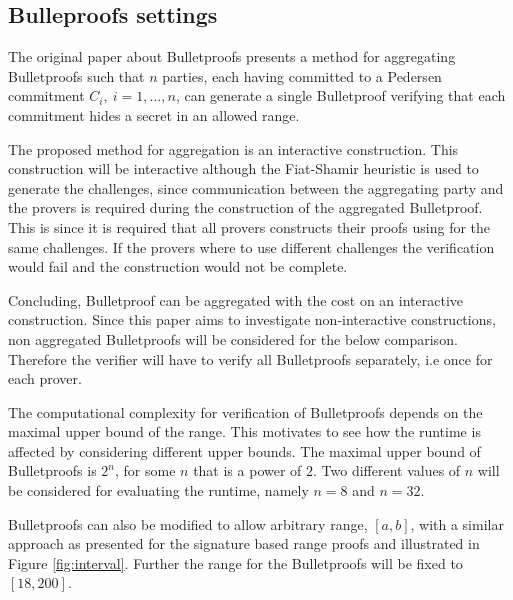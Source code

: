 \subsection*{Bulleproofs settings}

The original paper about Bulletproofs \cite{bulletProofs_theory} presents a method for aggregating Bulletproofs such that $n$ parties, each having committed to a Pedersen commitment $C_i,\: i=1,...,n$, can generate a single Bulletproof verifying that each commitment hides a secret in an allowed range. 

The proposed method for aggregation is an interactive construction. This construction will be interactive   although the Fiat-Shamir heuristic is used to generate the challenges, since communication between the aggregating party and the provers is required during the construction of the aggregated Bulletproof. This is since it is required that all provers constructs their proofs using  for the same challenges. If the provers where to use different challenges the verification would fail and the construction would not be complete. 

Concluding, Bulletproof can be aggregated with the cost on an interactive construction. Since this paper aims to investigate non-interactive constructions, non aggregated Bulletproofs will be considered for the below comparison. Therefore the verifier will have to verify all Bulletproofs separately, i.e once for each prover. 


The computational complexity for verification of Bulletproofs depends on the maximal upper bound of the range.  This motivates to see how the runtime is affected by considering different  upper bounds.  The maximal upper bound of Bulletproofs is $2^n$, for some $n$ that is a power of $2$. Two different values of $n$ will be considered for evaluating the runtime, namely $n=8 $ and $n= 32$. 

Bulletproofs can also be modified to allow arbitrary range, $[a,b]$, with a similar approach as presented for the signature based range proofs and illustrated in Figure \ref{fig:interval}. Further the range for the Bulletproofs will be fixed to  $[18,200]$. 

 

